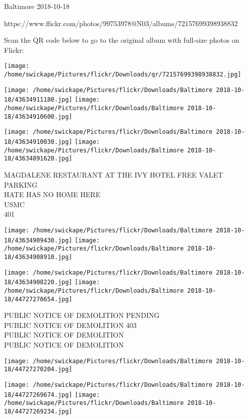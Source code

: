\documentclass[10pt,letterpaper]{article}
\begin{document}
Baltimore 2018-10-18

https://www.flickr.com/photos/99753978@N03/albums/72157699398938832

Scan the QR code below to go to the original album with full-size photos on Flickr:

\texttt{[image: /home/swickape/Pictures/flickr/Downloads/qr/72157699398938832.jpg]}
\pagebreak

\texttt{[image: /home/swickape/Pictures/flickr/Downloads/Baltimore 2018-10-18/43634911180.jpg]}
\texttt{[image: /home/swickape/Pictures/flickr/Downloads/Baltimore 2018-10-18/43634910600.jpg]}

\texttt{[image: /home/swickape/Pictures/flickr/Downloads/Baltimore 2018-10-18/43634910030.jpg]}
\texttt{[image: /home/swickape/Pictures/flickr/Downloads/Baltimore 2018-10-18/43634891620.jpg]}

MAGDALENE RESTAURANT AT THE IVY HOTEL FREE VALET PARKING\\
HATE HAS NO HOME HERE\\
USMC\\
401\\
\pagebreak

\texttt{[image: /home/swickape/Pictures/flickr/Downloads/Baltimore 2018-10-18/43634909430.jpg]}
\texttt{[image: /home/swickape/Pictures/flickr/Downloads/Baltimore 2018-10-18/43634908910.jpg]}

\texttt{[image: /home/swickape/Pictures/flickr/Downloads/Baltimore 2018-10-18/43634908220.jpg]}
\texttt{[image: /home/swickape/Pictures/flickr/Downloads/Baltimore 2018-10-18/44727270654.jpg]}

PUBLIC NOTICE OF DEMOLITION PENDING\\
PUBLIC NOTICE OF DEMOLITION 403\\
PUBLIC NOTICE OF DEMOLITION\\
PUBLIC NOTICE OF DEMOLITION\\
\pagebreak

\texttt{[image: /home/swickape/Pictures/flickr/Downloads/Baltimore 2018-10-18/44727270204.jpg]}

\vspace{0.25in}
\texttt{[image: /home/swickape/Pictures/flickr/Downloads/Baltimore 2018-10-18/44727269674.jpg]}
\texttt{[image: /home/swickape/Pictures/flickr/Downloads/Baltimore 2018-10-18/44727269234.jpg]}
\end{document}
